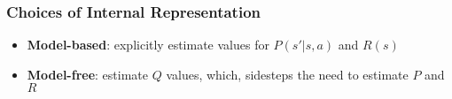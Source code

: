     \subsubsection{Choices of Internal Representation}

      \begin{itemize}
        \item \textbf{Model-based}: explicitly estimate values for
        $ P\left( s' | s, a \right) $ and $ R\left( s \right) $
        \item \textbf{Model-free}: estimate $ Q $ values, which, sidesteps the
        need to estimate $ P $ and $ R $
      \end{itemize}
